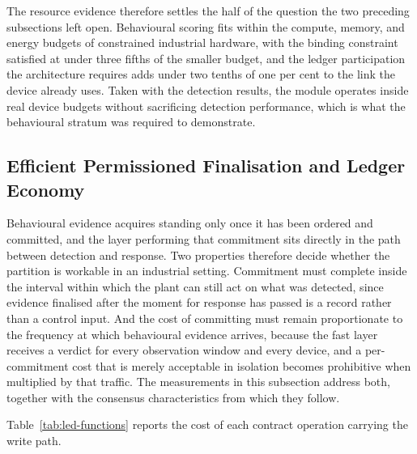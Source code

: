 The resource evidence therefore settles the half of the question the two preceding subsections left open. Behavioural scoring fits within the compute, memory, and energy budgets of constrained industrial hardware, with the binding constraint satisfied at under three fifths of the smaller budget, and the ledger participation the architecture requires adds under two tenths of one per cent to the link the device already uses. Taken with the detection results, the module operates inside real device budgets without sacrificing detection performance, which is what the behavioural stratum was required to demonstrate.

\subsection{Efficient Permissioned Finalisation and Ledger Economy}
\label{sec:eval-ledger}

Behavioural evidence acquires standing only once it has been ordered and committed, and the layer performing that commitment sits directly in the path between detection and response. Two properties therefore decide whether the partition is workable in an industrial setting. Commitment must complete inside the interval within which the plant can still act on what was detected, since evidence finalised after the moment for response has passed is a record rather than a control input. And the cost of committing must remain proportionate to the frequency at which behavioural evidence arrives, because the fast layer receives a verdict for every observation window and every device, and a per-commitment cost that is merely acceptable in isolation becomes prohibitive when multiplied by that traffic. The measurements in this subsection address both, together with the consensus characteristics from which they follow.

Table~\ref{tab:led-functions} reports the cost of each contract operation carrying the write path.

